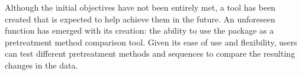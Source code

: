\documentclass[ENG, BIB]{TFUOC}%
\begin{document}
Although the initial objectives have not been entirely met, a tool has been created that is expected to help achieve them in the future. An unforeseen function has emerged with its creation: the ability to use the package as a pretreatment method comparison tool. Given its ease of use and flexibility, users can test different pretreatment methods and sequences to compare the resulting changes in the data.





\printglossary[type=acronym, style=altlist, title=Glossary, toctitle=Glossary]



\printbibliography[heading=bibintoc]


\newpage
\appendix
\end{document}
